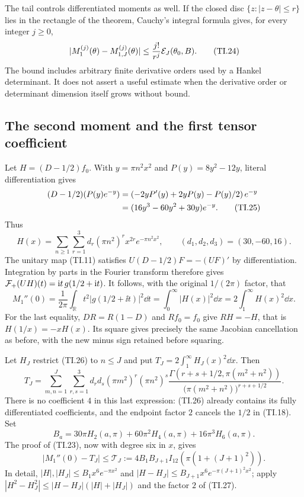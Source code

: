 The tail controls differentiated moments as well. If the closed disc
$\{z:|z-\theta|\le r\}$ lies in the rectangle of the theorem, Cauchy's
integral formula gives, for every integer $j\ge0$,
\begin{equation}
 |M_1^{(j)}(\theta)-M_{1,J}^{(j)}(\theta)|
 \le \frac{j!}{r^j}{\cal E}_J(\theta_0,B). \tag{TI.24}
\end{equation}
The bound includes arbitrary finite derivative orders used by a Hankel
determinant. It does not assert a useful estimate when the derivative
order or determinant dimension itself grows without bound.

\subsection{The second moment and the first tensor coefficient}

Let $H=(D-1/2)f_0$. With $y=\pi n^2x^2$ and
$P(y)=8y^2-12y$, literal differentiation gives
\begin{align}
 (D-1/2)(P(y)e^{-y})
 &=\left(-2yP'(y)+2yP(y)-P(y)/2\right)e^{-y}\notag\\
 &=(16y^3-60y^2+30y)e^{-y}. \tag{TI.25}
\end{align}
Thus
\begin{equation}
 H(x)=\sum_{n\ge1}\sum_{r=1}^3d_r(\pi n^2)^r x^{2r}e^{-\pi n^2x^2},
 \qquad(d_1,d_2,d_3)=(30,-60,16). \tag{TI.26}
\end{equation}
The unitary map (TI.11) satisfies
$U(D-1/2)F=-(UF)'$ by differentiation. Integration by parts in the
Fourier transform therefore gives
$\mathcal F_+(UH)(t)=\mathrm i t\,g(1/2+\mathrm i t)$. It follows, with the original
$1/(2\pi)$ factor, that
\begin{equation}
 M_1''(0)=\frac1{2\pi}\int_{\mathbb R}t^2|g(1/2+\ii t)|^2\dd t
 =\int_0^\infty |H(x)|^2\dd x=2\int_1^\infty H(x)^2\dd x.
 \tag{TI.27}
\end{equation}
For the last equality, $DR=R(1-D)$ and $Rf_0=f_0$ give
$RH=-H$, that is $H(1/x)=-xH(x)$. Its square gives precisely the
same Jacobian cancellation as before, with the new minus sign retained
before squaring.

Let $H_J$ restrict (TI.26) to $n\le J$ and put
$T_J=2\int_1^\infty H_J(x)^2\dd x$. Then
\begin{equation}
 T_J=\sum_{m,n=1}^J\sum_{r,s=1}^3
 d_rd_s(\pi m^2)^r(\pi n^2)^s
 \frac{\Gamma(r+s+1/2,\pi(m^2+n^2))}
 {\bigl(\pi(m^2+n^2)\bigr)^{r+s+1/2}}. \tag{TI.28}
\end{equation}
There is no coefficient $4$ in this last expression: (TI.26) already
contains its fully differentiated coefficients, and the endpoint
factor $2$ cancels the $1/2$ in (TI.18).
Set
\begin{equation}
 B_a=30\pi H_2(a,\pi)+60\pi^2H_4(a,\pi)+16\pi^3H_6(a,\pi).
 \tag{TI.29}
\end{equation}
The proof of (TI.23), now with degree six in $x$, gives
\begin{equation}
 |M_1''(0)-T_J|
 \le \mathcal T_J:=4B_1B_{J+1}I_{12}(\pi(1+(J+1)^2)). \tag{TI.30}
\end{equation}
In detail, $|H|,|H_J|\le B_1x^6e^{-\pi x^2}$ and
$|H-H_J|\le B_{J+1}x^6e^{-\pi(J+1)^2x^2}$; apply
$|H^2-H_J^2|\le|H-H_J|(|H|+|H_J|)$ and the factor $2$ of (TI.27).

